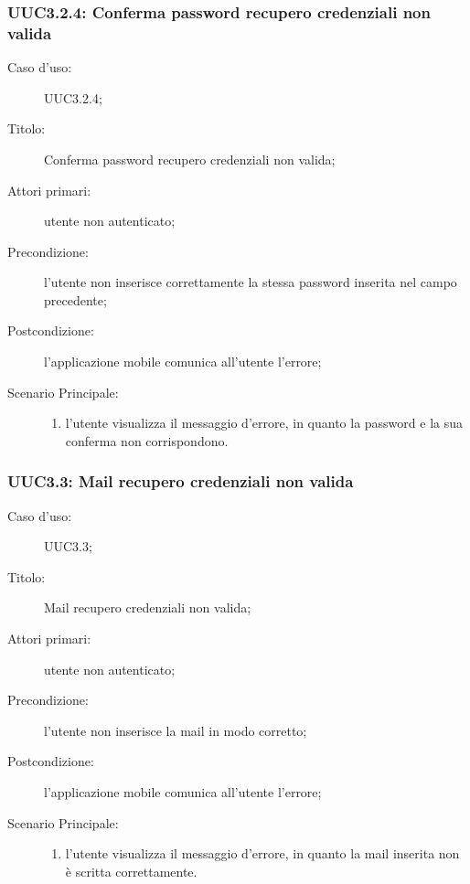 \documentclass[../../../analisi-dei-requisiti.tex]{subfiles}
\begin{document}
\subsubsection{UUC3.2.4: Conferma password recupero credenziali non valida}%
\label{subs:UUC3.2.4}
\begin{description}
  \item[Caso d'uso:] UUC3.2.4;
  \item[Titolo:] Conferma password recupero credenziali non valida;
  \item[Attori primari:] utente non autenticato;
  \item[Precondizione:] l'utente non inserisce correttamente la stessa password inserita nel campo precedente;
  \item[Postcondizione:] l'applicazione mobile comunica all'utente l'errore;
  \item[Scenario Principale:]
        \begin{enumerate}
          \item l'utente visualizza il messaggio d'errore, in quanto la password e la sua conferma non corrispondono.
        \end{enumerate}
\end{description}

\subsubsection{UUC3.3: Mail recupero credenziali non valida}%
\label{subs:UUC3.3}

\begin{description}
  \item[Caso d'uso:] UUC3.3;
  \item[Titolo:] Mail recupero credenziali non valida;
  \item[Attori primari:] utente non autenticato;
  \item[Precondizione:] l'utente non inserisce la mail in modo corretto;
  \item[Postcondizione:] l'applicazione mobile comunica all'utente l'errore;
  \item[Scenario Principale:]
        \begin{enumerate}
          \item l'utente visualizza il messaggio d'errore, in quanto la mail inserita non è scritta correttamente.
        \end{enumerate}
\end{description}
\end{document}
